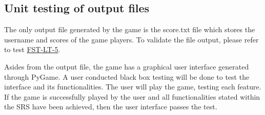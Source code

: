 \documentclass[12pt, titlepage]{article}
\begin{document}
	\subsection{Unit testing of output files}		
	
	The only output file generated by the game is the score.txt file which stores the username and scores of the game players. To validate the file output, please refer to test \hyperref[output_file]{FST-LT-5}.
	
	Asides from the output file, the game has a graphical user interface generated through PyGame. A user conducted black box testing will be done to test the interface and its functionalities. The user will play the game, testing each feature. If the game is successfully played by the user and all functionalities stated within the SRS have been achieved, then the user interface passes the test.
	
	
	
	
	
	
	\newpage
	
	
\end{document}
